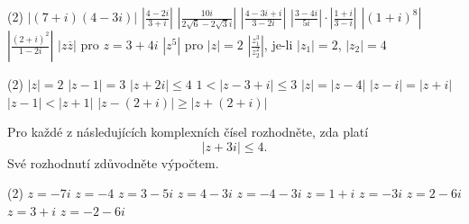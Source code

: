 \documentclass[12pt,a4paper]{article}
\begin{document}
\begin{exercise}[Vypočítejte]
    \begin{tasks}(2)
        \task $|(7+i)(4-3i)|$
        \task $\left|\frac{4-2i}{3+i}\right|$
        \task $\left|\frac{10i}{2\sqrt6-2\sqrt3 i}\right|$
        \task $\left|\frac{4-3i+i}{3-2i}\right|$
        \task $\left|\frac{3-4i}{5i}\right|\cdot\left|\frac{1+i}{3-i}\right|$
        \task $|(1+i)^8|$
        \task $\left|\frac{(2+i)^2}{1-2i}\right|$
        \task $|z\overline z|$ pro $z=3+4i$
        \task $|z^5|$ pro $|z|=2$
        \task $\left|\frac{z_1^3}{z_2^2}\right|$, je-li $|z_1|=2$, $|z_2|=4$
    \end{tasks}
\end{exercise}


\begin{exercise}
        \begin{tasks}(2)
            \task $|z|=2$
            \task $|z-1|=3$
            \task $|z+2i|\leq4$
            \task $1<|z-3+i|\leq3$
            \task $|z|=|z-4|$
            \task $|z-i|=|z+i|$
            \task $|z-1|<|z+1|$
            \task $|z-(2+i)|\geq|z+(2+i)|$
        \end{tasks}
\end{exercise}


\begin{exercise}
    Pro každé z následujících komplexních čísel rozhodněte, zda platí
    \[
        |z+3i|\leq4.
    \]
    Své rozhodnutí zdůvodněte výpočtem.

        \begin{tasks}(2)
            \task $z=-7i$
            \task $z=-4$
            \task $z=3-5i$
            \task $z=4-3i$
            \task $z=-4-3i$
            \task $z=1+i$
            \task $z=-3i$
            \task $z=2-6i$
            \task $z=3+i$
            \task $z=-2-6i$
        \end{tasks}
\end{exercise}
\end{document}
